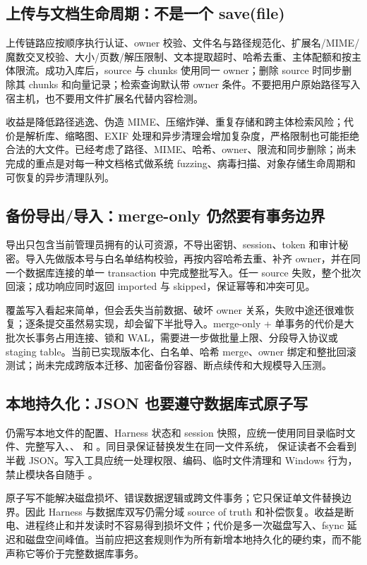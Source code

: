 \subsection{上传与文档生命周期：不是一个 save(file)}

上传链路应按顺序执行认证、owner 校验、文件名与路径规范化、扩展名/MIME/魔数交叉校验、大小/页数/解压限制、文本提取超时、哈希去重、主体配额和按主体限流。成功入库后，source 与 chunks 使用同一 owner；删除 source 时同步删除其 chunks 和向量记录；检索查询默认带 owner 条件。不要把用户原始路径写入宿主机，也不要用文件扩展名代替内容检测。

收益是降低路径逃逸、伪造 MIME、压缩炸弹、重复存储和跨主体检索风险；代价是解析库、缩略图、EXIF 处理和异步清理会增加复杂度，严格限制也可能拒绝合法的大文件。已经考虑了路径、MIME、哈希、owner、限流和同步删除；尚未完成的重点是对每一种文档格式做系统 fuzzing、病毒扫描、对象存储生命周期和可恢复的异步清理队列。

\subsection{备份导出/导入：merge-only 仍然要有事务边界}

导出只包含当前管理员拥有的认可资源，不导出密钥、session、token 和审计秘密。导入先做版本号与白名单结构校验，再按内容哈希去重、补齐 owner，并在同一个数据库连接的单一 transaction 中完成整批写入。任一 source 失败，整个批次回滚；成功响应同时返回 imported 与 skipped，保证幂等和冲突可见。

覆盖写入看起来简单，但会丢失当前数据、破坏 owner 关系，失败中途还很难恢复；逐条提交虽然易实现，却会留下半批导入。merge-only + 单事务的代价是大批次长事务占用连接、锁和 WAL，需要进一步做批量上限、分段导入协议或 staging table。当前已实现版本化、白名单、哈希 merge、owner 绑定和整批回滚测试；尚未完成跨版本迁移、加密备份容器、断点续传和大规模导入压测。

\subsection{本地持久化：JSON 也要遵守数据库式原子写}

仍需写本地文件的配置、Harness 状态和 session 快照，应统一使用同目录临时文件、完整写入、、 和 。同目录保证替换发生在同一文件系统， 保证读者不会看到半截 JSON。写入工具应统一处理权限、编码、临时文件清理和 Windows 行为，禁止模块各自随手 。

原子写不能解决磁盘损坏、错误数据逻辑或跨文件事务；它只保证单文件替换边界。因此 Harness 与数据库双写仍需分域 source of truth 和补偿恢复。收益是断电、进程终止和并发读时不容易得到损坏文件；代价是多一次磁盘写入、fsync 延迟和磁盘空间峰值。当前应把这套规则作为所有新增本地持久化的硬约束，而不能声称它等价于完整数据库事务。

